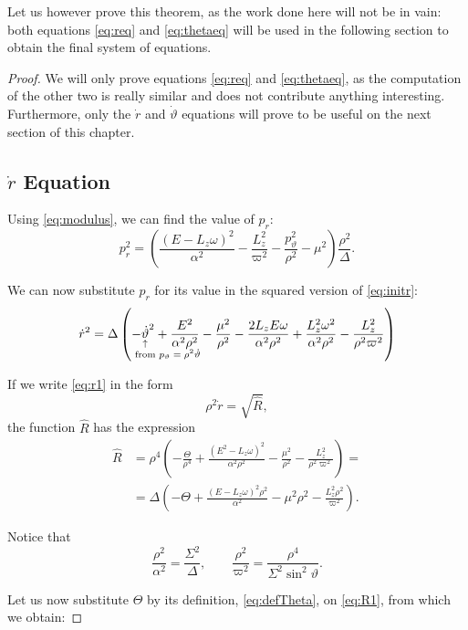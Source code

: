 Let us however prove this theorem, as the work done here will not be in vain: both equations \ref{eq:req} and \ref{eq:thetaeq} will be used in the following section to obtain the final system of equations.

\begin{proof}
	We will only prove equations \ref{eq:req} and \ref{eq:thetaeq}, as the computation of the other two is really similar and does not contribute anything interesting. Furthermore, only the $\dot{r}$ and $\dot{\vartheta}$ equations will prove to be useful on the next section of this chapter.
	
	\subsection*{$\dot{r}$ Equation}
	
	Using \autoref{eq:modulus}, we can find the value of $p_r$:
	\[
	p_r^2 = \left( \frac{(E - L_z\omega)^2}{\alpha^2} - \frac{L_z^2}{\varpi^2} - \frac{p_\vartheta^2}{\rho^2} - \mu^2 \right) \frac{\rho^2}{\Delta}.
	\]
	
	We can now substitute $p_r$ for its value in the squared version of \autoref{eq:initr}:
	\begin{equation}
	\label{eq:r1}
	\dot{r}^2 = \Delta \left( -\eqnote{\dot{\vartheta}}{from $p_\vartheta = \rho^2\dot{\vartheta}$}^2 + \frac{E^2}{\alpha^2\rho^2} - \frac{\mu^2}{\rho^2} - \frac{2L_zE\omega}{\alpha^2\rho^2} + \frac{L_z^2\omega^2}{\alpha^2\rho^2} - \frac{L_z^2}{\rho^2\varpi^2} \right)
	\end{equation}
	
	If we write \autoref{eq:r1} in the form
	\[
	\rho^2 \dot{r} = \sqrt{\widehat{R}},
	\]
	the function $\widehat{R}$ has the expression
	\begin{align}
	\nonumber
	\widehat{R} &= \rho^4 \left( -\frac{\Theta}{\rho^4} + \frac{(E^2 - L_z\omega)^2}{\alpha^2\rho^2} - \frac{\mu^2}{\rho^2} - \frac{L_z^2}{\rho^2\varpi^2} \right) = \\
	&= \Delta \left( -\Theta + \frac{(E-L_z\omega)^2\rho^2}{\alpha^2} - \mu^2\rho^2 - \frac{L_z^2 \rho^2}{\varpi^2} \right).
	\label{eq:R1}
	\end{align}
	
	Notice that
	\[
	\frac{\rho^2}{\alpha^2} = \frac{\Sigma^2}{\Delta}, \qquad \frac{\rho^2}{\varpi^2} = \frac{\rho^4}{\Sigma^2 \sin^2\vartheta}.
	\]
	
	Let us now substitute $\Theta$ by its definition, \autoref{eq:defTheta}, on \autoref{eq:R1}, from which we obtain:
	

\end{proof}
